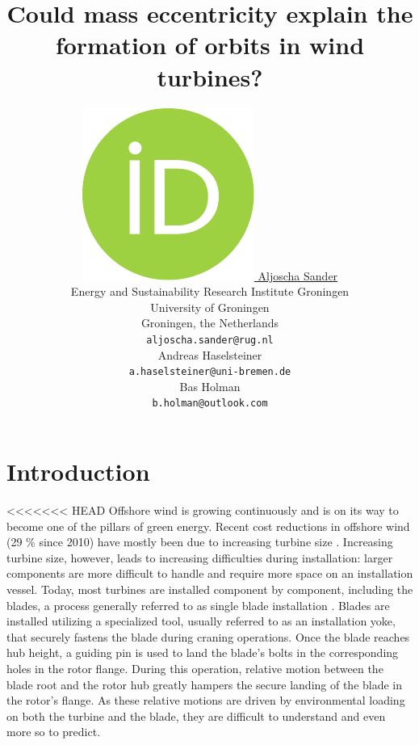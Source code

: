 \documentclass{article}
\title{Could mass eccentricity explain the formation of orbits in wind turbines?}
\author{ \href{https://orcid.org/0000-0001-8717-9688}{\includegraphics[scale=0.06]{orcid.pdf}\hspace{1mm} Aljoscha Sander} \\
	Energy and Sustainability Research Institute Groningen\\
	University of Groningen\\
	Groningen, the Netherlands \\
	\texttt{aljoscha.sander@rug.nl} \\
	\And
	Andreas Haselsteiner \\
	\texttt{a.haselsteiner@uni-bremen.de} \\
	\And
	Bas Holman \\
	\texttt{b.holman@outlook.com}\\
}
\begin{document}
\maketitle

\begin{abstract}
\end{abstract}




\section{Introduction}
\label{sec:introduction}

<<<<<<< HEAD
Offshore wind is growing continuously and is on its way to become one of the pillars of green energy. Recent cost reductions in offshore wind (29 \% since 2010) have mostly been due to increasing turbine size \citep{irenaRenewablePowerGeneration2020}. Increasing turbine size, however, leads to increasing difficulties during installation: larger components are more difficult to handle and require more space on an installation vessel. Today, most turbines are installed component by component, including the blades, a process generally referred to as single blade installation \citep{jiangInstallationOffshoreWind2021}. Blades are installed utilizing a specialized tool, usually referred to as an installation yoke, that securely fastens the blade during craning operations. Once the blade reaches hub height, a guiding pin is used to land the blade's bolts in the corresponding holes in the rotor flange. During this operation, relative motion between the blade root and the rotor hub greatly hampers the secure landing of the blade in the rotor's flange. As these relative motions are driven by environmental loading on both the turbine and the blade, they are difficult to understand and even more so to predict. 
\end{document}
